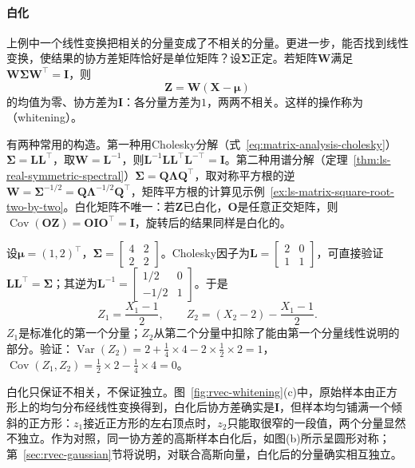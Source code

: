 \paragraph{白化}
上例中一个线性变换把相关的分量变成了不相关的分量。更进一步，能否找到线性变换，使结果的协方差矩阵恰好是单位矩阵？设$\bm\Sigma$正定。若矩阵$\bm W$满足$\bm W\bm\Sigma\bm W^{\top}=\bm I$，则
\[
 \bm Z=\bm W(\bm X-\bm\mu)
\]
的均值为零、协方差为$\bm I$：各分量方差为$1$，两两不相关。这样的操作称为（whitening）。

有两种常用的构造。第一种用Cholesky分解（式~\eqref{eq:matrix-analysis-cholesky}）$\bm\Sigma=\bm L\bm L^{\top}$，取$\bm W=\bm L^{-1}$，则$\bm L^{-1}\bm L\bm L^{\top}\bm L^{-\top}=\bm I$。第二种用谱分解（定理~\ref{thm:ls-real-symmetric-spectral}）$\bm\Sigma=\bm Q\bm\Lambda\bm Q^{\top}$，取对称平方根的逆$\bm W=\bm\Sigma^{-1/2}=\bm Q\bm\Lambda^{-1/2}\bm Q^{\top}$，矩阵平方根的计算见示例~\ref{ex:ls-matrix-square-root-two-by-two}。白化矩阵不唯一：若$\bm Z$已白化，$\bm O$是任意正交矩阵，则$\operatorname{Cov}(\bm O\bm Z)=\bm O\bm I\bm O^{\top}=\bm I$，旋转后的结果同样是白化的。

\begin{example}[用Cholesky因子白化]
\label{ex:rvec-whitening}
设$\bm\mu=(1,2)^{\top}$，$\bm\Sigma=\begin{bmatrix}4&2\\2&2\end{bmatrix}$。Cholesky因子为$\bm L=\begin{bmatrix}2&0\\1&1\end{bmatrix}$，可直接验证$\bm L\bm L^{\top}=\bm\Sigma$；其逆为$\bm L^{-1}=\begin{bmatrix}1/2&0\\-1/2&1\end{bmatrix}$。于是
\[
 Z_1=\frac{X_1-1}2,\qquad Z_2=(X_2-2)-\frac{X_1-1}2 .
\]
$Z_1$是标准化的第一个分量；$Z_2$从第二个分量中扣除了能由第一个分量线性说明的部分。验证：$\operatorname{Var}(Z_2)=2+\frac14\times4-2\times\frac12\times2=1$，$\operatorname{Cov}(Z_1,Z_2)=\frac12\times2-\frac14\times4=0$。
\end{example}

白化只保证不相关，不保证独立。图~\ref{fig:rvec-whitening}(c)中，原始样本由正方形上的均匀分布经线性变换得到，白化后协方差确实是$\bm I$，但样本均匀铺满一个倾斜的正方形：$z_1$接近正方形的左右顶点时，$z_2$只能取很窄的一段值，两个分量显然不独立。作为对照，同一协方差的高斯样本白化后，如图(b)所示呈圆形对称；第~\ref{sec:rvec-gaussian}节将说明，对联合高斯向量，白化后的分量确实相互独立。

